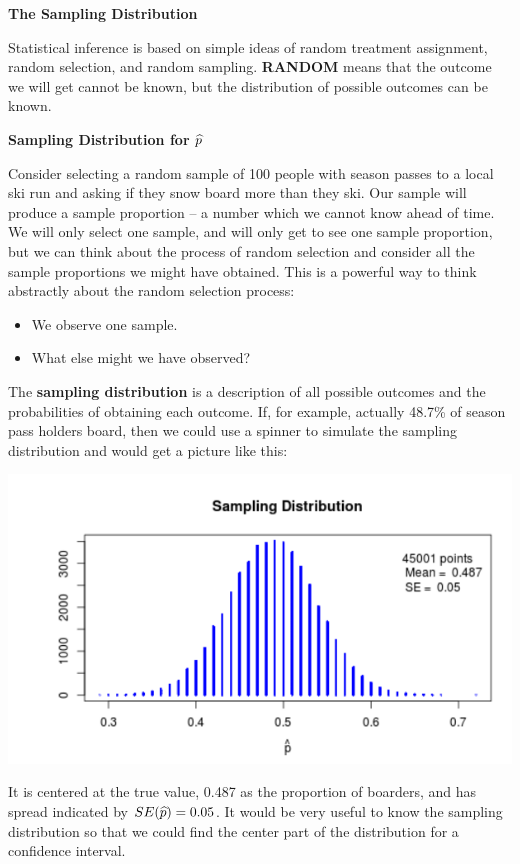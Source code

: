 \def\theTopic{Reading 9}

\begin{center}
  {\large \bf The Sampling Distribution}
\end{center}

 Statistical inference is based on simple ideas of random treatment
 assignment, random selection, and random sampling.   {\bf RANDOM} 
 means that the outcome we will get cannot be known, but the
 distribution of possible outcomes can be known. 

\begin{center}
  {\bf Sampling Distribution for $\widehat{p}$}
\end{center}
 Consider selecting a random sample of 100 people with season passes
 to a local ski run and asking if they snow board more than they ski.
 Our sample will produce a sample  proportion -- a number which we
 cannot know ahead of time.  We will only select 
 one sample, and will only get to see one sample proportion, but we
 can think about the process of random selection and consider all the
 sample proportions we might have obtained.  This is a powerful way to
 think abstractly about the random selection process:
 \begin{itemize}
 \item We observe one sample.
 \item What else might we have observed?
 \end{itemize}
  The {\bf sampling distribution} is a description of all possible
  outcomes and the probabilities of obtaining each outcome.  If, for
  example, actually 48.7\%  of season pass holders board, then we
  could use a spinner to simulate the sampling distribution and would
  get a picture like this:

  \includegraphics[width=.5\linewidth]{../plots/SampDistnofPhat-100.png}

It is centered at the true value, 0.487 as the proportion of boarders,
and has spread indicated by $SE(\widehat{p}) = 0.05$. 
It would be very useful to know the sampling distribution so that we
could find the center part of the distribution for a confidence
interval.  

